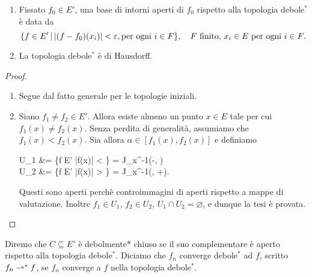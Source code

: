 \begin{lemma}
	\leavevmode
	\begin{enumerate}
		\item Fissato $f_0 \in E'$, una base di intorni aperti di $f_0$ rispetto alla topologia debole$^*$ è data da
		\begin{equation*}
			\{f \in E' \,|\, |(f-f_0)(x_i)| < \varepsilon, \text{per ogni $i \in F$}\}, \quad \text{$F$ finito, $x_i \in E$ per ogni $i \in F$.}
		\end{equation*}
		\item La topologia debole$^*$ è di Hausdorff.
	\end{enumerate}
\end{lemma}
\begin{proof}
	\leavevmode
	\begin{enumerate}
		\item Segue dal fatto generale per le topologie iniziali.
		\item Siano $f_1 \neq f_2 \in E'$. Allora esiste almeno un punto $x \in E$ tale per cui $f_1(x) \neq f_2(x)$. Senza perdita di generalità, assumiamo che $f_1(x) < f_2(x)$. Sia allora $\alpha \in [f_1(x), f_2(x)]$ e definiamo
		\begin{eqalign*}
			U_1 &= \{f \in E' \suchthat |f(x)| < \alpha\} = J_x^{-1}(-\infty, \alpha)\\
			U_2 &= \{f \in E' \suchthat |f(x)| > \alpha\} = J_x^{-1}(\alpha, +\infty).
		\end{eqalign*}
		Questi sono aperti perchè controimmagini di aperti rispetto a mappe di valutazione. Inoltre $f_1 \in U_1$, $f_2 \in U_2$, $U_1 \cap U_2 = \varnothing$, e dunque la tesi è provata.
	\end{enumerate}
\end{proof}

Diremo che $C \subseteq E'$ è debolmente$*$ chiuso se il suo complementare è aperto rispetto alla topologia debole$^*$. Diciamo che $f_n$ converge debole$^*$ ad $f$, scritto $f_n \rightharpoonup^* f$, se $f_n$ converge a $f$ nella topologia debole$^*$.

